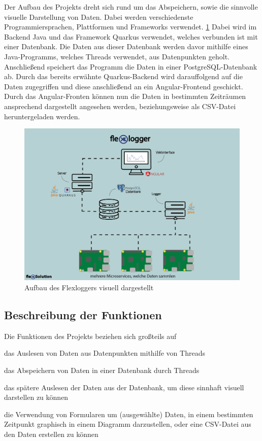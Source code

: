 
Der Aufbau des Projekts dreht sich rund um das Abspeichern, sowie die sinnvolle visuelle Darstellung von Daten. Dabei werden verschiedenste Programmiersprachen, Plattformen und Frameworks verwendet. \ref{fig:impl:FlexLoggerAufbau} 
Dabei wird im Backend Java und das Framework Quarkus verwendet, welches verbunden ist mit einer Datenbank. Die Daten aus dieser Datenbank werden davor mithilfe eines Java-Programms, welches Threads verwendet, aus Datenpunkten geholt. Anschließend speichert das Programm die Daten in einer PostgreSQL-Datenbank ab. Durch das bereits erwähnte Quarkus-Backend wird darauffolgend auf die Daten zugegriffen und diese anschließend an ein Angular-Frontend geschickt. Durch das Angular-Fronten können nun die Daten in bestimmten Zeiträumen ansprechend dargestellt angesehen werden, beziehungsweise als CSV-Datei heruntergeladen werden.

\begin{figure}
    \centering
    \includegraphics[scale=0.7]{pics/webinertface2.png}
    \caption{Aufbau des Flexloggers visuell dargestellt}
    \label{fig:impl:FlexLoggerAufbau}
\end{figure}

\subsection{Beschreibung der Funktionen}
Die Funktionen des Projekts beziehen sich großteils auf 
\begin{compactitem}
    \item das Auslesen von Daten aus Datenpunkten mithilfe von Threads
    \item das Abspeichern von Daten in einer Datenbank durch Threads
    \item das spätere Auslesen der Daten aus der Datenbank, um diese sinnhaft visuell darstellen zu können
    \item die Verwendung von Formularen um (ausgewählte) Daten, in einem bestimmten Zeitpunkt graphisch in einem Diagramm darzustellen, oder eine CSV-Datei aus den Daten erstellen zu können
\end{compactitem}


